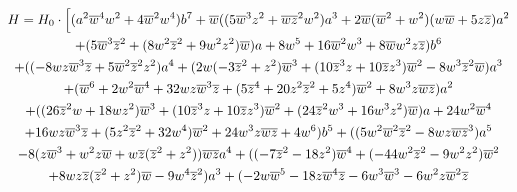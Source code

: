 \documentclass[12pt]{amsart}
\begin{document}
\begin{footnotesize}
\begin{multline*}
H=H_0\cdot
\Bigl [  ( {a}^{2}{{ \overline{w}}}^{4}{w}^{2}+4{{ \overline{w}}}^{2}{w}^
{4} ) {b}^{7}+{ \overline{w}} (  ( 5{{ \overline{w}}}^{3}{z}^{2}
+{ \overline{w}}{{ \overline{z}}}^{2}{w}^{2} ) {a}^{3}+2{ \overline{w}} ( 
{{ \overline{w}}}^{2}+{w}^{2} )  ( w{ \overline{w}}+5z{ \overline{z}} ) 
{a}^{2}\\
+ ( 5{{ \overline{w}}}^{3}{{ \overline{z}}}^{2}+ ( 8{w}^{2}{{
 \overline{z}}}^{2}+9{w}^{2}{z}^{2} ) { \overline{w}} ) a+8{w}^{5}+
16{{ \overline{w}}}^{2}{w}^{3}+8{ \overline{w}}{w}^{2}z{ \overline{z}} ) {b}^{6
}\\
+ (  ( -8wz{{ \overline{w}}}^{3}{ \overline{z}}+5{{ \overline{w}}}^{2}{{ 
\overline{z}}}^{2}{z}^{2} ) {a}^{4}+ ( 2w ( -3{{ \overline{z}}}^{2}
+{z}^{2} ) {{ \overline{w}}}^{3}+ ( 10{{ \overline{z}}}^{3}z+10{ 
\overline{z}}{z}^{3} ) {{ \overline{w}}}^{2}-8{w}^{3}{{ \overline{z}}}^{2}{ \overline{w}}
 ) {a}^{3}\\
 + ( {{ \overline{w}}}^{6}+2{w}^{2}{{ \overline{w}}}^{4}+32w
z{{ \overline{w}}}^{3}{ \overline{z}}+ ( 5{{ \overline{z}}}^{4}+20{z}^{2}{{ \overline{z}}
}^{2}+5{z}^{4} ) {{ \overline{w}}}^{2}+8{w}^{3}z{ \overline{w}}{ \overline{z}}
 ) {a}^{2}\\
 + (  ( 26{{ \overline{z}}}^{2}w+18w{z}^{2}
 ) {{ \overline{w}}}^{3}+ ( 10{{ \overline{z}}}^{3}z+10{ \overline{z}}{z}^
{3} ) {{ \overline{w}}}^{2}+ ( 24{{ \overline{z}}}^{2}{w}^{3}+16{w}^{
3}{z}^{2} ) { \overline{w}} ) a+24{w}^{2}{{ \overline{w}}}^{4}\\
+16wz{
{ \overline{w}}}^{3}{ \overline{z}}+ ( 5{z}^{2}{{ \overline{z}}}^{2}+32{w}^{4}
 ) {{ \overline{w}}}^{2}+24{w}^{3}z{ \overline{w}}{ \overline{z}}+4{w}^{6}
 ) {b}^{5}+ (  ( 5{w}^{2}{{ \overline{w}}}^{2}{{ \overline{z}}}^{2
}-8wz{ \overline{w}}{{ \overline{z}}}^{3} ) {a}^{5}\\
-8 ( z{{ \overline{w}}}
^{3}+{w}^{2}z{ \overline{w}}+w{ \overline{z}} ( {{ \overline{z}}}^{2}+{z}^{2}
 )  ) { \overline{w}}{ \overline{z}}{a}^{4}+ (  ( -7{{
 \overline{z}}}^{2}-18{z}^{2} ) {{ \overline{w}}}^{4}+ ( -44{w}^{2}{{
 \overline{z}}}^{2}-9{w}^{2}{z}^{2} ) {{ \overline{w}}}^{2}\\
 +8wz{ \overline{z}}
 ( {{ \overline{z}}}^{2}+{z}^{2} ) { \overline{w}}-9{w}^{4}{{ \overline{z}}}^{
2} ) {a}^{3}+ ( -2w{{ \overline{w}}}^{5}-18z{{ \overline{w}}}^{4}{
 \overline{z}}-6{w}^{3}{{ \overline{w}}}^{3}-6{w}^{2}z{{ \overline{w}}}^{2}{ \overline{z}}\\

\end{multline*}
\end{footnotesize}
\end{document}
